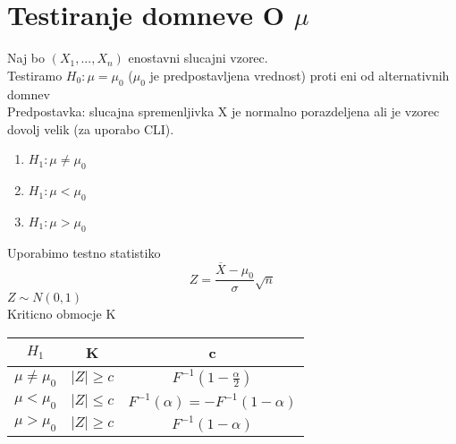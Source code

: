 \section{Testiranje domneve O $\mu$}
Naj bo $(X_1,...,X_n)$ enostavni slucajni vzorec.\\
Testiramo $H_0:\mu=\mu_0$ ($\mu_0$ je predpostavljena vrednost) proti eni od alternativnih domnev\\
Predpostavka: slucajna spremenljivka X je normalno porazdeljena ali je vzorec dovolj velik (za uporabo CLI).
\begin{enumerate}
    \item $H_1:\mu \neq \mu_0$
    \item $H_1:\mu < \mu_0$
    \item $H_1:\mu > \mu_0$
\end{enumerate}

Uporabimo testno statistiko $$Z=\frac{\overline{X}-\mu_0}{\sigma}\sqrt{n}$$
$Z\sim N(0,1)$\\
Kriticno obmocje K\\
\begin{tabular}{|c|c|c|}
    \hline
    $H_1$ & K & c \\
    \hline
    $\mu\neq \mu_0$ & $|Z|\ge c$ & $F^{-1}(1-\frac{\alpha}{2})$ \\
    $\mu < \mu_0$ & $|Z|\le c$ & $F^{-1}(\alpha)=-F^{-1}(1-\alpha)$ \\
    $\mu > \mu_0$ & $|Z|\ge c$ & $F^{-1}(1-\alpha)$ \\
    \hline
\end{tabular}